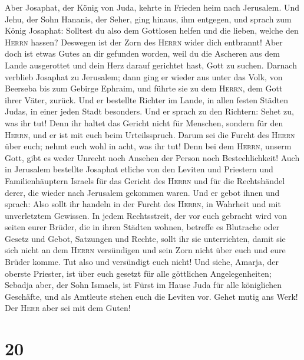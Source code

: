  Aber Josaphat, der König von Juda, kehrte in Frieden heim
nach Jerusalem.  Und Jehu, der Sohn Hananis, der Seher,
ging hinaus, ihm entgegen, und sprach zum König Josaphat: Solltest du
also dem Gottlosen helfen und die lieben, welche den \textsc{Herrn}
hassen? Deswegen ist der Zorn des \textsc{Herrn} wider dich entbrannt!
 Aber doch ist etwas Gutes an dir gefunden worden, weil du
die Ascheren aus dem Lande ausgerottet und dein Herz darauf gerichtet
hast, Gott zu suchen.  Darnach verblieb Josaphat zu
Jerusalem; dann ging er wieder aus unter das Volk, von Beerseba bis zum
Gebirge Ephraim, und führte sie zu dem \textsc{Herrn}, dem Gott ihrer
Väter, zurück.  Und er bestellte Richter im Lande, in
allen festen Städten Judas, in einer jeden Stadt besonders.
 Und er sprach zu den Richtern: Sehet zu, was ihr tut!
Denn ihr haltet das Gericht nicht für Menschen, sondern für den
\textsc{Herrn}, und er ist mit euch beim Urteilsspruch. 
Darum sei die Furcht des \textsc{Herrn} über euch; nehmt euch wohl in
acht, was ihr tut! Denn bei dem \textsc{Herrn}, unserm Gott, gibt es
weder Unrecht noch Ansehen der Person noch Bestechlichkeit!
 Auch in Jerusalem bestellte Josaphat etliche von den
Leviten und Priestern und Familienhäuptern Israels für das Gericht des
\textsc{Herrn} und für die Rechtshändel derer, die wieder nach Jerusalem
gekommen waren.  Und er gebot ihnen und sprach: Also sollt
ihr handeln in der Furcht des \textsc{Herrn}, in Wahrheit und mit
unverletztem Gewissen.  In jedem Rechtsstreit, der vor
euch gebracht wird von seiten eurer Brüder, die in ihren Städten wohnen,
betreffe es Blutrache oder Gesetz und Gebot, Satzungen und Rechte, sollt
ihr sie unterrichten, damit sie sich nicht an dem \textsc{Herrn}
versündigen und sein Zorn nicht über euch und eure Brüder komme. Tut
also und versündigt euch nicht!  Und siehe, Amarja, der
oberste Priester, ist über euch gesetzt für alle göttlichen
Angelegenheiten; Sebadja aber, der Sohn Ismaels, ist Fürst im Hause Juda
für alle königlichen Geschäfte, und als Amtleute stehen euch die Leviten
vor. Gehet mutig ans Werk! Der \textsc{Herr} aber sei mit dem Guten!

\hypertarget{section-19}{%
\section{20}\label{section-19}}

